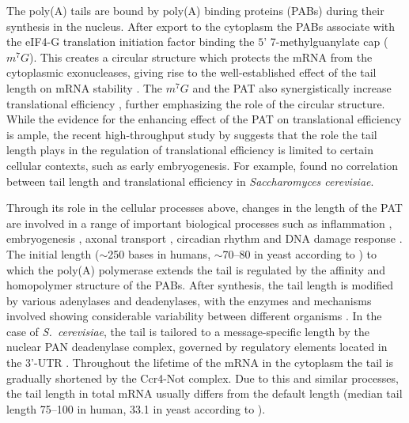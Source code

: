 \documentclass[10pt]{article}
\begin{document}
The poly(A) tails are bound by poly(A) binding proteins (PABs) during their synthesis in the nucleus. After export to the cytoplasm the PABs associate with the eIF4-G translation initiation factor binding the $5’$ 7-methylguanylate cap ($m^7G$). This creates a circular structure which protects the mRNA from the cytoplasmic exonucleases, giving rise to the well-established effect of the tail length on mRNA stability \cite{subtelny14,houseley06}. The $m^7G$ and the PAT also synergistically increase translational efficiency \cite{gallie91}, further emphasizing the role of the circular structure. While the evidence for the enhancing effect of the PAT on translational efficiency \cite{preiss98,lackner07} is ample, the recent high-throughput study by \cite{subtelny14} suggests that the role the tail length plays in the regulation of translational efficiency is limited to certain cellular contexts, such as early embryogenesis. For example, \cite{subtelny14} found no correlation between tail length and translational efficiency in \textit{Saccharomyces cerevisiae}.

Through its role in the cellular processes above, changes in the length of the PAT are involved in a range of important biological processes such as inflammation \cite{weill12}, embryogenesis \cite{weill12,subtelny14}, axonal transport \cite{weill12}, circadian rhythm \cite{gotic12} and DNA damage response \cite{traven05}. The initial length ($\sim$250 bases in humans, $\sim$70--80 in yeast according to \cite{eckmann11}) to which the poly(A) polymerase extends the tail is regulated by the affinity and homopolymer structure of the PABs. After synthesis, the tail length is modified by various adenylases and deadenylases, with the enzymes and mechanisms involved showing considerable variability between different organisms \cite{brown98,eckmann11}. In the case of \textit{S.~cerevisiae}, the tail is tailored to a message-specific length by the nuclear PAN deadenylase complex, governed by regulatory elements located in the 3’-UTR \cite{brown98,beilharz07}. Throughout the lifetime of the mRNA in the cytoplasm the tail is gradually shortened by the Ccr4-Not complex. Due to this and similar processes, the tail length in total mRNA usually differs from the default length (median tail length 75--100 in human, 33.1 in yeast according to \cite{subtelny14}).
\end{document}
